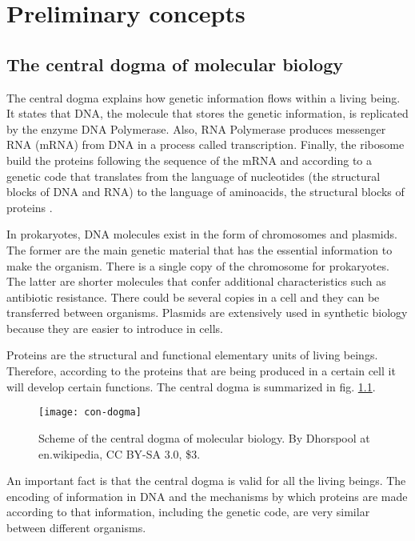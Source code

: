 \chapter{Preliminary concepts}


\section{The central dogma of molecular biology}

The central dogma explains how genetic information flows within a living being. It states that DNA, the molecule that stores the genetic information, is replicated by the enzyme DNA Polymerase. Also, RNA Polymerase produces messenger RNA (mRNA) from DNA in a process called transcription. Finally, the ribosome build the proteins following the sequence of the mRNA and according to a genetic code that translates from the language of nucleotides (the structural blocks of DNA and RNA) to the language of aminoacids, the structural blocks of proteins \cite{alberts13}.

In prokaryotes, DNA molecules exist in the form of chromosomes and plasmids. The former are the main genetic material that has the essential information to make the organism. There is a single copy of the chromosome for prokaryotes. The latter are shorter molecules that confer additional characteristics such as antibiotic resistance. There could be several copies in a cell and they can be transferred between organisms. Plasmids are extensively used in synthetic biology because they are easier to introduce in cells.

Proteins are the structural and functional elementary units of living beings. Therefore, according to the proteins that are being produced in a certain cell it will develop certain functions. The central dogma is summarized in fig. \ref{fig:con-dogma}.

\begin{figure}[H]
  \centering
  \texttt{[image: con-dogma]}
  \caption[Central dogma of molecular biology]{\label{fig:con-dogma} Scheme of the central dogma of molecular biology. By Dhorspool at en.wikipedia, CC BY-SA 3.0, \$3.}
\end{figure}

An important fact is that the central dogma is valid for all the living beings. The encoding of information in DNA and the mechanisms by which proteins are made according to that information, including the genetic code, are very similar between different organisms.

